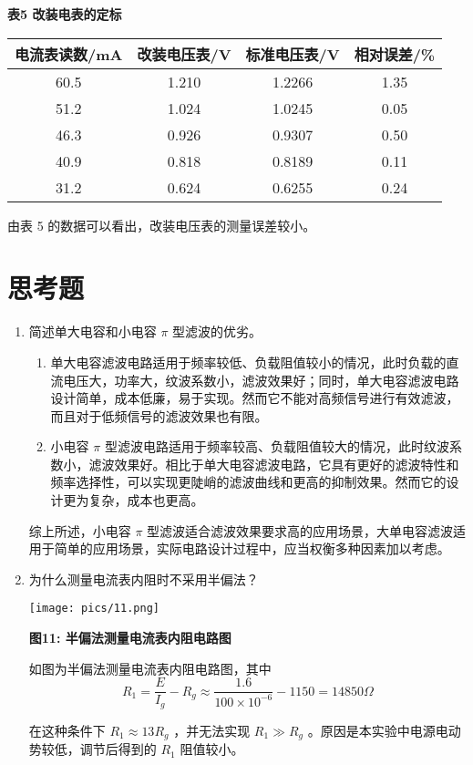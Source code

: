 \documentclass[10pt,a4paper]{article}
\makeatletter
\newenvironment{figurehere}
{\def\@captype{figure}}
{}
\newenvironment{tablehere}
{\def\@captype{table}}
{}
\makeatother
\begin{document}
	\begin{tablehere}
		\caption*{\bf 表5 改装电表的定标}
		\noindent	
		\begin{center}
			\begin{tabular}{|c|c|c|c|}
				\hline
				电流表读数/mA   & 改装电压表/V & 标准电压表/V & 相对误差/\%\\ \hline
				60.5 & 1.210 & 1.2266 & 1.35 \\ \hline
				51.2 & 1.024 & 1.0245 & 0.05 \\ \hline
				46.3 & 0.926 & 0.9307 & 0.50 \\ \hline
				40.9 & 0.818 & 0.8189 & 0.11 \\ \hline
				31.2 & 0.624 & 0.6255 & 0.24 \\ \hline
			\end{tabular}
			\vspace*{1em}
		\end{center}
	\end{tablehere}

	由表 5 的数据可以看出，改装电压表的测量误差较小。
	
	\section{思考题}

	

	\begin{enumerate}
	\item 简述单大电容和小电容 $\pi$ 型滤波的优劣。

	\begin{enumerate}
		\item 单大电容滤波电路适用于频率较低、负载阻值较小的情况，此时负载的直流电压大，功率大，纹波系数小，滤波效果好；同时，单大电容滤波电路设计简单，成本低廉，易于实现。然而它不能对高频信号进行有效滤波，而且对于低频信号的滤波效果也有限。
		\item 小电容 $\pi$ 型滤波电路适用于频率较高、负载阻值较大的情况，此时纹波系数小，滤波效果好。相比于单大电容滤波电路，它具有更好的滤波特性和频率选择性，可以实现更陡峭的滤波曲线和更高的抑制效果。然而它的设计更为复杂，成本也更高。
	\end{enumerate}

	综上所述，小电容 $\pi$ 型滤波适合滤波效果要求高的应用场景，大单电容滤波适用于简单的应用场景，实际电路设计过程中，应当权衡多种因素加以考虑。

	\item 为什么测量电流表内阻时不采用半偏法？

	\begin{figurehere}
		\centering
		\texttt{[image: pics/11.png]}
		\caption*{\bf 图11: 半偏法测量电流表内阻电路图}
	\end{figurehere}

	如图为半偏法测量电流表内阻电路图，其中
	$$
	R_1=\frac{E}{I_g}-R_g \approx \frac{1.6}{100 \times 10^{-6}}-1150=14850 \Omega
	$$

	在这种条件下 $R_1 \approx 13 R_g$ ，并无法实现 $R_1 \gg R_g$ 。原因是本实验中电源电动势较低，调节后得到的 $R_1$ 阻值较小。
	\end{enumerate}
\end{document}

